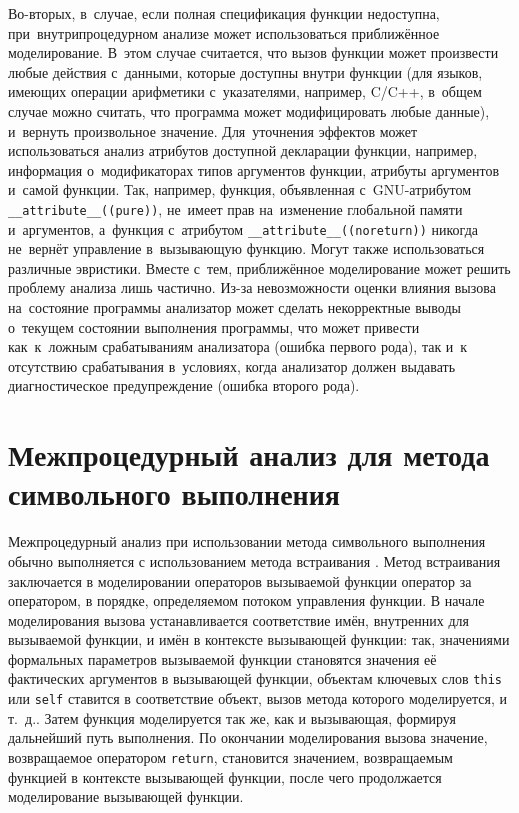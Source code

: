 Во-вторых, в~случае, если полная спецификация функции недоступна, при~внутрипроцедурном анализе может использоваться приближённое моделирование. В~этом случае считается, что вызов функции может произвести любые действия с~данными, которые доступны внутри функции (для языков, имеющих операции арифметики с~указателями, например, C/C++, в~общем случае можно считать, что программа может модифицировать любые данные), и~вернуть произвольное значение. Для~уточнения эффектов может использоваться анализ атрибутов доступной декларации функции, например, информация о~модификаторах типов аргументов функции, атрибуты аргументов и~самой функции. Так, например, функция, объявленная с~GNU-атрибутом \texttt{\_\_attribute\_\_((pure))}, не~имеет прав на~изменение глобальной памяти и~аргументов, а~функция с~атрибутом \texttt{\_\_attribute\_\_((noreturn))} никогда не~вернёт управление в~вызывающую функцию. Могут также использоваться различные эвристики. Вместе с~тем, приближённое моделирование может решить проблему анализа лишь частично. Из-за невозможности оценки влияния вызова на~состояние программы анализатор может сделать некорректные выводы о~текущем состоянии выполнения программы, что может привести как~к~ложным срабатываниям анализатора (ошибка первого рода), так и~к отсутствию срабатывания в~условиях, когда анализатор должен выдавать диагностическое предупреждение (ошибка второго рода).

\section{Межпроцедурный анализ для метода символьного выполнения}

Межпроцедурный анализ при использовании метода символьного выполнения обычно выполняется с использованием метода встраивания \cite{dragon-book}. Метод встраивания заключается в моделировании операторов вызываемой функции оператор за оператором, в порядке, определяемом потоком управления функции. В начале моделирования вызова устанавливается соответствие имён, внутренних для вызываемой функции, и имён в контексте вызывающей функции: так, значениями формальных параметров вызываемой функции становятся значения её фактических аргументов в вызывающей функции, объектам ключевых слов \texttt{this} или \texttt{self} ставится в соответствие объект, вызов метода которого моделируется, и т.~д.. Затем функция моделируется так же, как и вызывающая, формируя дальнейший путь выполнения. По окончании моделирования вызова значение, возвращаемое оператором \texttt{return}, становится значением, возвращаемым функцией в контексте вызывающей функции, после чего продолжается моделирование вызывающей функции.

